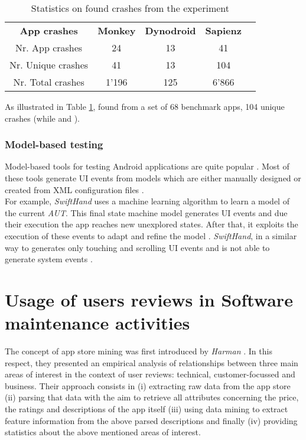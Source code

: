 \begin{table}[tb]
\centering
\caption{Statistics on found crashes from the \sapienz experiment}
\label{tbl: sapienzresults}
\begin{tabular}{|c|c|c|c|l}
\cline{1-4}
\textbf{App crashes} & \textbf{Monkey} & \textbf{Dynodroid} & \textbf{Sapienz} &  \\ \cline{1-4}
Nr. App crashes      & 24              & 13                 & 41               &  \\ \cline{1-4}
Nr. Unique crashes   & 41              & 13                 & 104              &  \\ \cline{1-4}
Nr. Total crashes    & 1'196           & 125                & 6'866             &  \\ \cline{1-4}
\end{tabular}
\end{table}
As illustrated in Table \ref{tbl: sapienzresults}, \sapienz found from a set of 68 benchmark apps, 104 unique crashes (while  and ).

\subsubsection{Model-based testing}
Model-based tools for testing Android applications are quite popular \cite{sapienz}. Most of these tools \cite{mobiguitar, mining, guiripper,swift} generate UI events from models which are either manually designed or created from XML configuration files \cite{sapienz}. \\
For example, \textit{SwiftHand} \cite{swift} uses a machine learning algorithm to learn a model of the current \textit{AUT}. This final state machine model \cite{areWeThereYet} generates UI events and due their execution the app reaches new unexplored states. After that, it exploits the execution of these events to adapt and refine the model \cite{swift}. \textit{SwiftHand}, in a similar way to \monkey generates only touching and scrolling UI events and is not able to generate system events \cite{areWeThereYet}.

\section{Usage of users reviews in Software maintenance activities}
\label{section:review_usage}
The concept of app store mining was first introduced by \textit{Harman} \etal
\cite{appstoremining}. In this respect, they presented an empirical analysis of relationships between three main areas of interest in the context of user reviews: technical, customer-focussed and business. 
Their approach consists in (i) extracting raw data from the app store (ii) parsing that data with the aim to retrieve all attributes concerning the price, the ratings and descriptions of the app itself (iii) using data mining to extract feature information from the above parsed descriptions and finally (iv) providing statistics about the above mentioned areas of interest.  

